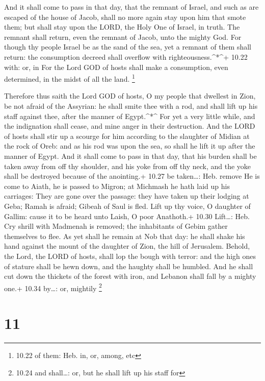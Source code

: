  And it shall come to pass in that day, that the remnant of
Israel, and such as are escaped of the house of Jacob, shall no more
again stay upon him that smote them; but shall stay upon the LORD, the
Holy One of Israel, in truth.  The remnant shall return,
even the remnant of Jacob, unto the mighty God.  For though
thy people Israel be as the sand of the sea, yet a remnant of them shall
return: the consumption decreed shall overflow with
righteousness.\^{}*\^{}+ 10.22 with: or, in  For the Lord
GOD of hosts shall make a consumption, even determined, in the midst of
all the land. \footnote{10.22 of them: Heb. in, or, among, etc}

 Therefore thus saith the Lord GOD of hosts, O my people
that dwellest in Zion, be not afraid of the Assyrian: he shall smite
thee with a rod, and shall lift up his staff against thee, after the
manner of Egypt.\^{}*\^{}  For yet a very little while, and
the indignation shall cease, and mine anger in their destruction.
 And the LORD of hosts shall stir up a scourge for him
according to the slaughter of Midian at the rock of Oreb: and as his rod
was upon the sea, so shall he lift it up after the manner of Egypt.
 And it shall come to pass in that day, that his burden
shall be taken away from off thy shoulder, and his yoke from off thy
neck, and the yoke shall be destroyed because of the anointing.+ 10.27
be taken\ldots: Heb. remove  He is come to Aiath, he is
passed to Migron; at Michmash he hath laid up his carriages:
 They are gone over the passage: they have taken up their
lodging at Geba; Ramah is afraid; Gibeah of Saul is fled. 
Lift up thy voice, O daughter of Gallim: cause it to be heard unto
Laish, O poor Anathoth.+ 10.30 Lift\ldots: Heb. Cry shrill with
 Madmenah is removed; the inhabitants of Gebim gather
themselves to flee.  As yet shall he remain at Nob that
day: he shall shake his hand against the mount of the daughter of Zion,
the hill of Jerusalem.  Behold, the Lord, the LORD of
hosts, shall lop the bough with terror: and the high ones of stature
shall be hewn down, and the haughty shall be humbled.  And
he shall cut down the thickets of the forest with iron, and Lebanon
shall fall by a mighty one.+ 10.34 by\ldots: or, mightily \footnote{10.24
  and shall\ldots: or, but he shall lift up his staff for}

\hypertarget{section-10}{%
\section{11}\label{section-10}}

